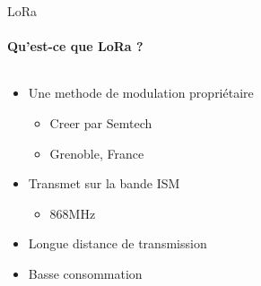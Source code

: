 \begin{frame}{LoRa}
\framesubtitle{Qu'est-ce que LoRa ?}
\begin{columns}
  \begin{column}{0.6\textwidth}
    
  \begin{itemize}
    \item Une methode de modulation propriétaire
    \begin{itemize}
      \item Creer par Semtech
      \item Grenoble, France
    \end{itemize}
    \item Transmet sur la bande ISM
    \begin{itemize}
      \item 868MHz
    \end{itemize}
    \item Longue distance de transmission
    \item Basse consommation
  \end{itemize}
  \end{column}
  \begin{column}{0.4\textwidth}
  \end{column}
\end{columns}
\end{frame}

